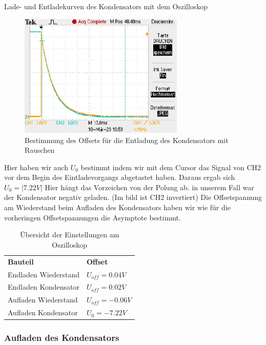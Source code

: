 \documentclass[twoside]{protokoll}
\begin{document}
\begin{aufgabe}{Lade- und Entladekurven des Kondensators mit dem Oszilloskop}
\begin{figure}[H]
     
  \centering
    \includegraphics[width=0.7\textwidth]{Bilder_Osziloskop/Entladen_Kondensator_Offset.pdf}
    \caption{Bestimmung des Offsets für die Entladung des Kondensators mit Rauschen}
  \centering
\end{figure}

Hier haben wir auch $U_0$ bestimmt indem wir mit dem Cursor das Signal von CH2 vor dem Begin des Eintladevorgangs abgetastet haben. Daraus ergab sich $U_0 = |7.22V|$ Hier hängt das Vorzeichen von der Polung ab. in unserem Fall war der Kondensator negativ geladen. (Im bild ist CH2 invertiert)
Die Offsetspannung am Wiederstand beim Aufladen des Kondensators haben wir wie für die vorheringen Offsetspannungen die Asymptote bestimmt.

\begin{table}[H]
        \centering
        \begin{tabularx}{1.0\textwidth}{X X} %
            \toprule
            \textbf{Bauteil} & \textbf{Offset} \\
            Endladen Wiederstand & $U_{off} = 0.04V$ \\
            Endladen Kondensator & $U_{off} = 0.02V$ \\
            Aufladen Wiederstand & $U_{off} = -0.06V$ \\
            Aufladen Kondensator & $U_{0} = -7.22V$ \\
            \midrule
            \bottomrule
        \end{tabularx}
        \caption{Übersicht der Einstellungen am Oszilloskop}
        \label{tab:mytable}
    \end{table}
    
 \subsubsection{Aufladen des Kondensators}
 

\end{aufgabe}
\end{document}
